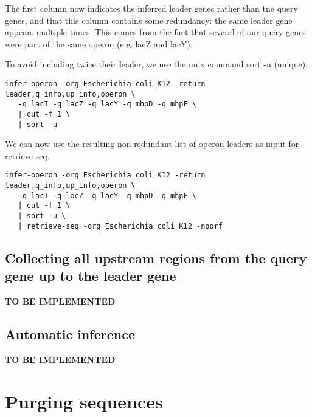 The first column now indicates the inferred leader genes rather than
tne query genes, and that this column contains some redundancy: the
same leader gene appears multiple times. This comes from the fact that
several of our query genes were part of the same operon (e.g.:lacZ and
lacY).

To avoid including twice their leader, we use the unix command sort -u
(unique).


{\color{Blue} \begin{footnotesize}
\begin{verbatim}
infer-operon -org Escherichia_coli_K12 -return leader,q_info,up_info,operon \
   -q lacI -q lacZ -q lacY -q mhpD -q mhpF \
   | cut -f 1 \
   | sort -u 
\end{verbatim} \end{footnotesize}
}

We can now use the resulting non-redundant list of operon leaders as
input for retrieve-seq.

{\color{Blue} \begin{footnotesize}
\begin{verbatim}
infer-operon -org Escherichia_coli_K12 -return leader,q_info,up_info,operon \
   -q lacI -q lacZ -q lacY -q mhpD -q mhpF \
   | cut -f 1 \
   | sort -u \
   | retrieve-seq -org Escherichia_coli_K12 -noorf
\end{verbatim} \end{footnotesize}
}


\subsection{Collecting all upstream regions from the query gene up to
  the leader gene}

\textbf{TO BE IMPLEMENTED}

\subsection{Automatic inference}

\textbf{TO BE IMPLEMENTED}


\section{Purging sequences}

\tbw
